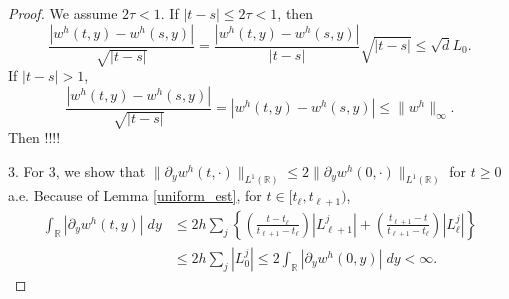 \documentclass[a4paper,11pt]{article}
\theoremstyle{remark}
\begin{document}
\begin{proof}
{ We assume $2\tau<1$. If $|t-s| \le 2\tau < 1$, then 
 $$\frac{|w^h(t,y) - w^h(s,y)|}{\sqrt{|t-s|}} = \frac{|w^h(t,y) - w^h(s,y)|}{|t-s|}\sqrt{|t-s|}\le \sqrt{d}L_0.$$
 If $|t-s| > 1$, $$\frac{|w^h(t,y) - w^h(s,y)|}{\sqrt{|t-s|}} = |w^h(t,y) - w^h(s,y)|\le \|w^h\|_\infty.$$
 Then !!!!
 }

3. For 3, we show that $\|\partial_y w^h(t,\cdot)\|_{L^1(\mathbb{R})} \le 2\|\partial_y w^h(0,\cdot)\|_{L^1(\mathbb{R})}$ for $t\ge0$ a.e. Because of Lemma \ref{uniform_est}, for $t\in[t_\ell, t_{\ell+1})$,
\begin{align*}
 \int_\mathbb{R} |\partial_y w^h(t,y)| \; dy &\le 2h\sum_j\left\{\left(\tfrac{t-t_\ell}{t_{\ell+1}-t_\ell} \right)|L^j_{\ell+1}| + \left(\tfrac{t_{\ell+1}-t}{t_{\ell+1}-t_\ell} \right) |L^j_{\ell}|\right\}\\
 &\le 2h\sum_j |L^j_0|\le 2\int_\mathbb{R} |\partial_y w^h(0,y)| \; dy < \infty.
\end{align*}
 

\end{proof}
\end{document}
